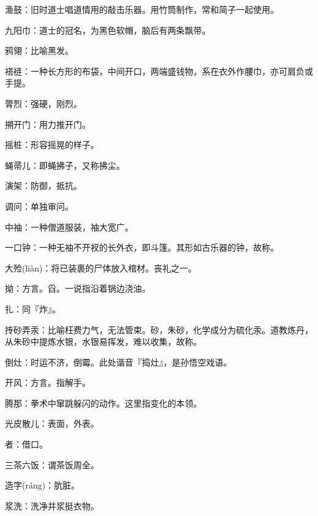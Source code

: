 \startbuffer[959]
渔鼓：旧时道士唱道情用的敲击乐器。用竹筒制作，常和简子一起使用。
\stopbuffer


\startbuffer[960]
九阳巾：道士的冠名，为黑色软帽，脑后有两条飘带。
\stopbuffer


\startbuffer[961]
鸦翎：比喻黑发。
\stopbuffer


\startbuffer[962]
褡裢：一种长方形的布袋，中间开口，两端盛钱物，系在衣外作腰巾，亦可肩负或手提。
\stopbuffer


\startbuffer[963]
膂烈：强硬，刚烈。
\stopbuffer


\startbuffer[964]
搠开门：用力推开门。
\stopbuffer


\startbuffer[965]
摇桩：形容摇晃的样子。
\stopbuffer


\startbuffer[966]
蝇帚儿：即蝇拂子，又称拂尘。
\stopbuffer


\startbuffer[967]
演架：防御，抵抗。
\stopbuffer


\startbuffer[968]
调问：单独审问。
\stopbuffer


\startbuffer[969]
中袖：一种僧道服装，袖大宽广。
\stopbuffer


\startbuffer[970]
一口钟：一种无袖不开衩的长外衣，即斗篷。其形如古乐器的钟，故称。
\stopbuffer


\startbuffer[971]
大殓(liàn)：将已装裹的尸体放入棺材。丧礼之一。
\stopbuffer


\startbuffer[972]
拗：方言。舀。一说指沿着锅边浇油。
\stopbuffer


\startbuffer[973]
扎：同『炸』。
\stopbuffer


\startbuffer[974]
抟砂弄汞：比喻枉费力气，无法管束。砂，朱砂，化学成分为硫化汞。道教炼丹，从朱砂中提炼水银，水银易挥发，难以收集，故称。
\stopbuffer


\startbuffer[975]
倒灶：时运不济，倒霉。此处谐音『捣灶』，是孙悟空戏语。
\stopbuffer


\startbuffer[976]
开风：方言。指解手。
\stopbuffer


\startbuffer[977]
腾那：拳术中窜跳躲闪的动作。这里指变化的本领。
\stopbuffer


\startbuffer[978]
光皮散儿：表面，外表。
\stopbuffer


\startbuffer[979]
者：借口。
\stopbuffer


\startbuffer[980]
三茶六饭：谓茶饭周全。
\stopbuffer


\startbuffer[981]
造字(ráng)：肮脏。
\stopbuffer


\startbuffer[982]
浆洗：洗净并浆挺衣物。
\stopbuffer


